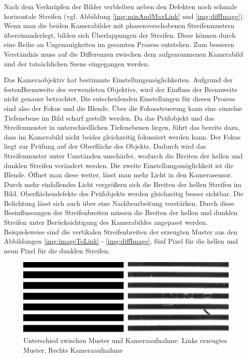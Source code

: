 Nach dem Verknüpfen der Bilder verbleiben neben den Defekten noch schmale horizontale Streifen (vgl. Abbildung \ref{img:minAndMaxLink} und \ref{img:diffImage}).
Wenn man die beiden Kamerabilder mit phasenverschobenen Streifenmustern übereinanderlegt, bilden sich Überlappungen der Streifen.
Diese können durch eine Reihe an Ungenauigkeiten im gesamten Prozess entstehen.
Zum besseren Verständnis muss auf die Differenzen zwischen dem aufgenommenen Kamerabild und der tatsächlichen Szene eingegangen werden.

\p
Das Kameraobjektiv hat bestimmte Einstellungsmöglichkeiten.
Aufgrund der festen\linebreak Brennweite des verwendeten Objektivs, wird der Einfluss der Brennweite nicht genauer betrachtet.
Die entscheidenden Einstellungen für diesen Prozess sind also der Fokus und die Blende.
Über die Fokussteuerung kann eine einzelne Tiefenebene im Bild scharf gestellt werden.
Da das Prüfobjekt und das Streifenmuster in unterschiedlichen Tiefenebenen liegen, führt das bereits dazu, dass im Kamerabild nicht beides gleichzeitig fokussiert werden kann.
Der Fokus liegt zur Prüfung auf der Oberfläche des Objekts.
Dadurch wird das Streifenmuster unter Umständen unschärfer, wodurch die Breiten der hellen und dunklen Streifen verändert werden.
Die zweite Einstellungsmöglichkeit ist die Blende.
Öffnet man diese weiter, lässt man mehr Licht in den Kamerasensor.
Durch mehr einfallendes Licht vergrößern sich die Breiten der hellen Streifen im Bild. 
Oberflächendefekte des Prüfobjekts werden gleichzeitig besser sichtbar.
Die Belichtung lässt sich auch über eine Nachbearbeitung verstärken.
Durch diese Beeinflussungen der Streifenbreiten müssen die Breiten der hellen und dunklen Streifen unter Berücksichtigung des Kamerabildes angepasst werden.
Beispielsweise sind die vertikalen Streifenbreiten der erzeugten Muster aus den Abbildungen \ref{img:imageToLink} - \ref{img:diffImage}, fünf Pixel für die hellen und neun Pixel für die dunklen Streifen.

\begin{figure}[H]
	\centering
	\includegraphics[width=\textwidth]{03_sichtpruefungDurchLichtstreuung/optimierungen/figures/differenceCameraPattern}
	\caption[Unterschied zwischen Muster und Kameraaufnahme]{Unterschied zwischen Muster und Kameraaufnahme. Links erzeugtes Muster, Rechts Kameraaufnahme}
	\label{img:differenceCamPat}
\end{figure}

